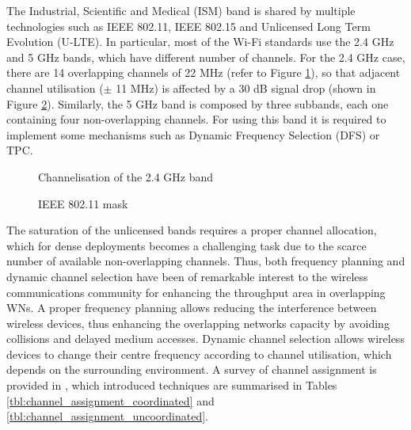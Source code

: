 \documentclass[12pt, a4paper,twoside]{tesi_upf}
\begin{document}
			The Industrial, Scientific and Medical (ISM) band is shared by multiple technologies such as IEEE 802.11, IEEE 802.15 and Unlicensed Long Term Evolution (U-LTE). In particular, most of the Wi-Fi standards use the 2.4 GHz	and 5 GHz bands, which have different number of channels. For the 2.4 GHz case, there are 14 overlapping channels of 22 MHz (refer to Figure \ref{fig:channelisation_wifi}), so that adjacent channel utilisation ($\pm$ 11 MHz) is affected by a 30 dB signal drop (shown in Figure \ref{fig:80211ad_mask}). Similarly, the 5 GHz band is composed by three subbands, each one containing four non-overlapping channels. For using this band it is required to implement some mechanisms such as Dynamic Frequency Selection (DFS) or TPC.
			\begin{figure}[h!]
				\centering
				\caption{Channelisation of the 2.4 GHz band}
				\label{fig:channelisation_wifi}
			\end{figure}
			\begin{figure}[h!]
				\centering
				\caption{IEEE 802.11 mask}
				\label{fig:80211ad_mask}
			\end{figure}
			
			The saturation of the unlicensed bands requires a proper channel allocation, which for dense deployments becomes a challenging task due to the scarce number of available non-overlapping channels. Thus, both frequency planning and dynamic channel selection have been of remarkable interest to the wireless communications community for enhancing the throughput area in overlapping WNs. A proper frequency planning allows reducing the interference between wireless devices, thus enhancing the overlapping networks capacity by avoiding collisions and delayed medium accesses. Dynamic channel selection allows wireless devices to change their centre frequency according to channel utilisation, which depends on the surrounding environment. A survey of channel assignment is provided in \cite{chieochan2010channel}, which introduced techniques are summarised in Tables \ref{tbl:channel_assignment_coordinated} and \ref{tbl:channel_assignment_uncoordinated}.
			
\end{document}
